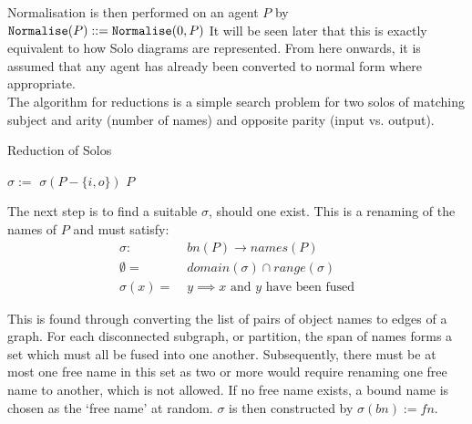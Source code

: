         Normalisation is then performed on an agent $P$ by $\texttt{Normalise}(P) ::= \texttt{Normalise}(0, P)$
        It will be seen later that this is exactly equivalent to how Solo diagrams are represented.
        From here onwards, it is assumed that any agent has already been converted to normal form where appropriate.\\

        The algorithm for reductions is a simple search problem for two solos of matching subject and arity (number of names) and opposite parity (input vs. output).
        \begin{breakablealgorithm}
            \caption{Reduction of Solos}
            \begin{algorithmic}[1]
                     
                         
                             
                                \State$\sigma :=$ 
                                    \State\Return$\sigma(P - \{i, o\})$
                                \EndIf
                            \EndIf
                        \EndFor
                    \EndFor
                    \State\Return$P$
                \EndFunction
            \end{algorithmic}
        \end{breakablealgorithm}

        The next step is to find a suitable $\sigma$, should one exist. This is a renaming of the names of $P$ and must satisfy:
        \begin{align*}
            \sigma : \; & bn(P) \rightarrow names(P) \\
            \emptyset = \; & domain(\sigma) \cap range(\sigma) \\
            \sigma(x) = \; & y \implies \text{$x$ and $y$ have been fused}
        \end{align*}

        This is found through converting the list of pairs of object names to edges of a graph.
        For each disconnected subgraph, or partition, the span of names forms a set which must all be fused into one another.
        Subsequently, there must be at most one free name in this set as two or more would require renaming one free name to another, which is not allowed.
        If no free name exists, a bound name is chosen as the `free name' at random.
        $\sigma$ is then constructed by $\sigma(bn) := fn$.

